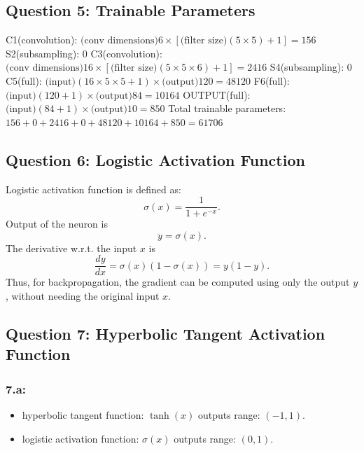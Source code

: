 \documentclass{article}
\begin{document}
\subsection*{Question 5: Trainable Parameters}
C1(convolution): $\text{(conv dimensions)}6 \times [\text{(filter size)}(5 \times 5) + 1] = 156$\newline
S2(subsampling): $0$\newline
C3(convolution): $\text{(conv dimensions)}16 \times [\text{(filter size)}(5 \times 5 \times 6) + 1] = 2416$\newline
S4(subsampling): $0$\newline
C5(full): $\text{(input)}(16 \times 5 \times 5 + 1) \times \text{(output)}120 = 48120$\newline
F6(full): $\text{(input)}(120 + 1) \times \text{(output)}84 = 10164$\newline
OUTPUT(full): $\text{(input)}(84 + 1) \times \text{(output)}10 = 850$\newline\newline
Total trainable parameters: $156 + 0 + 2416 + 0 + 48120 + 10164 + 850 = 61706$\newline


\subsection*{Question 6: Logistic Activation Function}
Logistic activation function is defined as:
\[
\sigma(x) = \frac{1}{1+e^{-x}}.
\]
Output of the neuron is
\[
y = \sigma(x).
\]
The derivative w.r.t. the input \(x\) is
\[
\frac{dy}{dx} = \sigma(x)(1-\sigma(x)) = y(1-y).
\]
Thus, for backpropagation, the gradient can be computed using only the output \(y\), without needing the original input \(x\).\newline


\subsection*{Question 7: Hyperbolic Tangent Activation Function}
\subsubsection*{7.a:}
\begin{itemize}
     \item hyperbolic tangent function: \(\tanh(x)\) outputs range: \((-1, 1)\).
     \item logistic activation function: \(\sigma(x)\) outputs range: \((0, 1)\).
\end{itemize}
\end{document}
